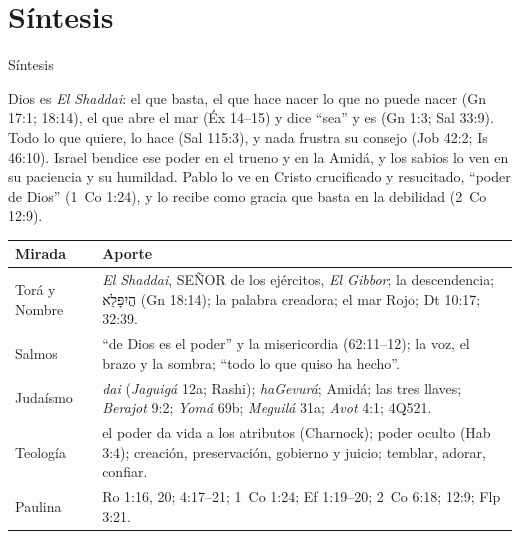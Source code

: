 \documentclass[hyperref={bookmarks=false},aspectratio=169]{beamer}
\newcommand{\heb}[1]{\mbox{\foreignlanguage{hebrew}{#1}}}
\newcommand{\SENOR}{S{\fontsize{0.78em}{1em}\selectfont EÑOR}}
\begin{document}
\section{Síntesis}

\begin{frame}{Síntesis}
\begin{tcolorbox}[colback=papiro,colframe=azul,boxrule=1pt,arc=3pt]
\footnotesize Dios es \emph{El Shaddai}: el que basta, el que hace nacer lo que no puede nacer (Gn 17:1; 18:14), el que abre el mar (Éx 14--15) y dice ``sea'' y es (Gn 1:3; Sal 33:9). Todo lo que quiere, lo hace (Sal 115:3), y nada frustra su consejo (Job 42:2; Is 46:10). Israel bendice ese poder en el trueno y en la Amidá, y los sabios lo ven en su paciencia y su humildad. Pablo lo ve en Cristo crucificado y resucitado, ``poder de Dios'' (1~Co 1:24), y lo recibe como gracia que basta en la debilidad (2~Co 12:9).
\end{tcolorbox}
\scriptsize\renewcommand{\arraystretch}{1.12}
\begin{tabular}{@{}>{\RaggedRight\arraybackslash}p{2.0cm}>{\RaggedRight\arraybackslash}p{9.8cm}@{}}
\toprule
\textbf{Mirada} & \textbf{Aporte} \\ \midrule
Torá y Nombre & \emph{El Shaddai}, \SENOR{} de los ejércitos, \emph{El Gibbor}; la descendencia; \heb{הֲיִפָּלֵא} (Gn 18:14); la palabra creadora; el mar Rojo; Dt 10:17; 32:39. \\
Salmos & ``de Dios es el poder'' y la misericordia (62:11--12); la voz, el brazo y la sombra; ``todo lo que quiso ha hecho''. \\
Judaísmo & \emph{dai} (\emph{Jaguigá} 12a; Rashi); \emph{haGevurá}; Amidá; las tres llaves; \emph{Berajot} 9:2; \emph{Yomá} 69b; \emph{Meguilá} 31a; \emph{Avot} 4:1; 4Q521. \\
Teología & el poder da vida a los atributos (Charnock); poder oculto (Hab 3:4); creación, preservación, gobierno y juicio; temblar, adorar, confiar. \\
Paulina & Ro 1:16, 20; 4:17--21; 1~Co 1:24; Ef 1:19--20; 2~Co 6:18; 12:9; Flp 3:21. \\
\bottomrule
\end{tabular}
\end{frame}
\end{document}
